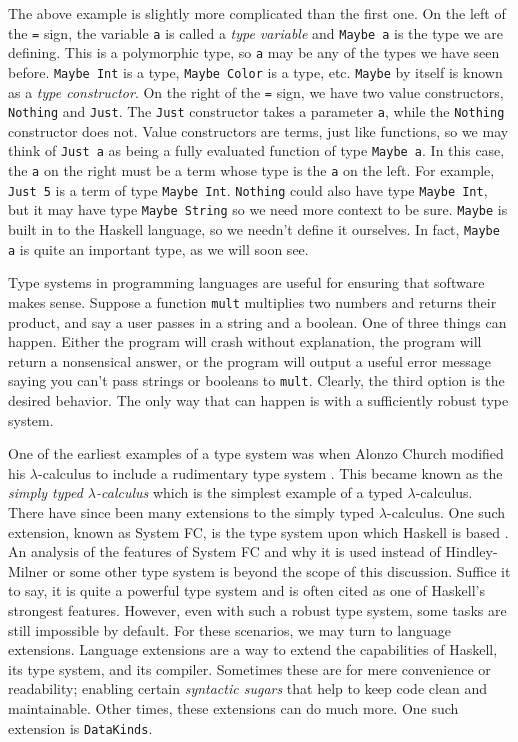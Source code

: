 \documentclass[MS, xcolor=dvipsnames]{wfuthesis}
\theoremstyle{definition}
\begin{document}
The above example is slightly more complicated than the first one. On the left of the \lstinline{=} sign, the variable \lstinline{a} is called a \emph{type variable} and \lstinline{Maybe a} is the type we are defining. This is a polymorphic type, so \lstinline{a} may be any of the types we have seen before. \lstinline{Maybe Int} is a type, \lstinline{Maybe Color} is a type, etc. \lstinline{Maybe} by itself is known as a \emph{type constructor}. On the right of the \lstinline{=} sign, we have two value constructors, \lstinline{Nothing} and \lstinline{Just}. The \lstinline{Just} constructor takes a parameter \lstinline{a}, while the \lstinline{Nothing} constructor does not. Value constructors are terms, just like functions, so we may think of \lstinline{Just a} as being a fully evaluated function of type \lstinline{Maybe a}. In this case, the \lstinline{a} on the right must be a term whose type is the \lstinline{a} on the left. For example, \lstinline{Just 5} is a term of type \lstinline{Maybe Int}. \lstinline{Nothing} could also have type \lstinline{Maybe Int}, but it may have type \lstinline{Maybe String} so we need more context to be sure. \lstinline{Maybe} is built in to the Haskell language, so we needn't define it ourselves. In fact, \lstinline{Maybe a} is quite an important type, as we will soon see. \par
Type systems in programming languages are useful for ensuring that software makes sense. Suppose a function \lstinline{mult} multiplies two numbers and returns their product, and say a user passes in a string and a boolean. One of three things can happen. Either the program will crash without explanation, the program will return a nonsensical answer, or the program will output a useful error message saying you can't pass strings or booleans to \lstinline{mult}. Clearly, the third option is the desired behavior. The only way that can happen is with a sufficiently robust type system. \par
One of the earliest examples of a type system was when Alonzo Church modified his $\lambda$-calculus to include a rudimentary type system \cite{Church1940}. This became known as the \emph{simply typed $\lambda$-calculus} which is the simplest example of a typed $\lambda$-calculus. There have since been many extensions to the simply typed $\lambda$-calculus. One such extension, known as System FC, is the type system upon which Haskell is based \cite{Eisenberg2013}. An analysis of the features of System FC and why it is used instead of Hindley-Milner \cite{Milner1978} or some other type system is beyond the scope of this discussion. Suffice it to say, it is quite a powerful type system and is often cited as one of Haskell's strongest features. However, even with such a robust type system, some tasks are still impossible by default. For these scenarios, we may turn to language extensions. Language extensions are a way to extend the capabilities of Haskell, its type system, and its compiler. Sometimes these are for mere convenience or readability; enabling certain \emph{syntactic sugars} that help to keep code clean and maintainable. Other times, these extensions can do much more. One such extension is \lstinline{DataKinds}. \par
\end{document}

